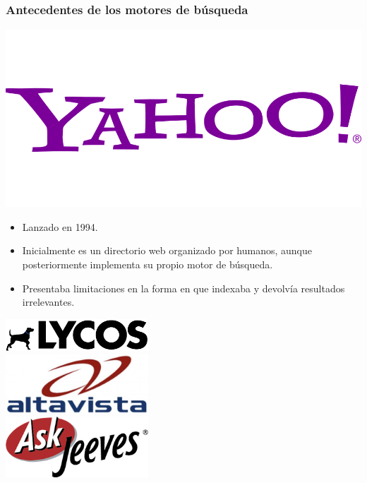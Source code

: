 \documentclass[
10pt, %
aspectratio=169, %
]{beamer}
\begin{document}
	\begin{frame}
		
		\frametitle{Antecedentes de los motores de búsqueda}
		
		\begin{minipage}[c]{0.6\textwidth}
			\includegraphics[width=\textwidth]{yahoo.png}

			\begin{itemize}
				\item Lanzado en 1994.
				\item Inicialmente es un directorio web organizado por humanos, aunque posteriormente implementa su propio motor de búsqueda.
				\item Presentaba limitaciones en la forma en que indexaba y  devolvía resultados irrelevantes.
			\end{itemize}
			
		\end{minipage}%
		\hfill
		\begin{minipage}[c]{0.3\textwidth}
			\centering
			\includegraphics[width=0.4\textwidth]{Lycos.png}\\[1ex]
			\includegraphics[width=0.4\textwidth]{altavista.png}\\[1ex]
			\includegraphics[width=0.4\textwidth]{ask.png}
		\end{minipage}
		
	\end{frame}
	
\end{document}
